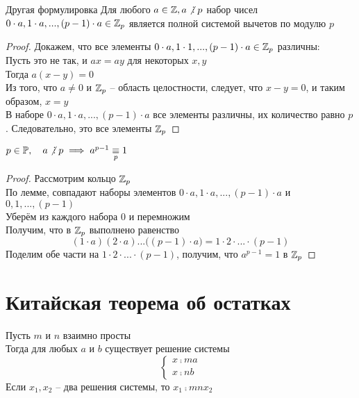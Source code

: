 \begin{undefthm}{Другая формулировка}
	Для любого $a \in \Z, a \ndivby p$ набор чисел $0 \cdot a, 1 \cdot a, ..., (p - 1) \cdot a \in \mathbb{Z}_p$ является полной системой вычетов по модулю $p$
\end{undefthm}

\begin{proof}
	Докажем, что все элементы $0 \cdot a, 1 \cdot 1, ..., (p - 1) \cdot a \in \mathbb{Z}_p$ различны: \\
	Пусть это не так, и $ax = ay$ для некоторых $x, y$ \\
	Тогда $a(x - y) = 0$ \\
	Из того, что $a \ne 0$ и $\mathbb{Z}_p$ -- область целостности, следует, что $x - y = 0$, и таким образом, $x = y$ \\
	В наборе $0 \cdot a, 1 \cdot a, ..., (p - 1) \cdot a$ все элементы различны, их количество равно $p$. Следовательно, это все элементы $\mathbb{Z}_p$
\end{proof}

\begin{theorem}
	$p \in \Prime, \quad a \ndivby p \implies a^{p - 1} \comp{p} 1 $
\end{theorem}

\begin{proof}
	Рассмотрим кольцо $\mathbb{Z}_p$ \\
	По лемме, совпадают наборы элементов $0 \cdot a, 1 \cdot a, ..., (p - 1) \cdot a$ и $0, 1, ..., (p - 1)$ \\
	Уберём из каждого набора $0$ и перемножим \\
	Получим, что в $\mathbb{Z}_p$ выполнено равенство
	$$ (1 \cdot a) (2 \cdot a)...\bigg( (p - 1) \cdot a \bigg) = 1 \cdot 2 \cdot ... \cdot (p - 1) $$
	Поделим обе части на $1 \cdot 2 \cdot ... \cdot (p - 1)$, получим, что $a^{p - 1} = 1$ в $\mathbb{Z}_p$
\end{proof}

\section{Китайская теорема об остатках}

\begin{theorem}
	Пусть $m$ и $n$ взаимно просты \\
	Тогда для любых $a$ и $b$ существует решение системы
	$$ \begin{cases}
		x \comp{m} a \\
		x \comp{n} b
	   \end{cases} $$
	   Если $x_1, x_2$ -- два решения системы, то $x_1 \comp{mn} x_2 $
\end{theorem}

